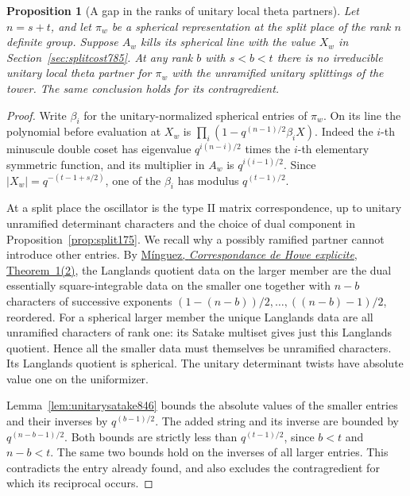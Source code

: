 \documentclass[a4paper,11pt]{article}
\newtheorem{proposition}{Proposition}[section]
\theoremstyle{definition}
\theoremstyle{remark}
\numberwithin{equation}{section}
\begin{document}
\begin{proposition}[A gap in the ranks of unitary local theta partners]
\leavevmode\label{prop:splitpartner846}
Let \(n=s+t\), and let \(\pi_w\) be a spherical representation at
the split place of the rank \(n\) definite group. Suppose \(A_w\)
kills its spherical line with the value \(X_w\) in
Section~\ref{sec:splitcost785}. At any rank \(b\) with \(s<b<t\)
there is no irreducible unitary local theta partner for \(\pi_w\)
with the unramified unitary splittings of the tower. The same
conclusion holds for its contragredient.
\end{proposition}
\begin{proof}
Write \(\beta_i\) for the unitary-normalized spherical entries of
\(\pi_w\). On its line the polynomial before evaluation at \(X_w\)
is \(\prod_i(1-q^{(n-1)/2}\beta_i X)\).
Indeed the \(i\)-th minuscule double coset has eigenvalue
\(q^{i(n-i)/2}\) times the \(i\)-th elementary symmetric
function, and its multiplier in \(A_w\) is \(q^{i(i-1)/2}\).
Since \(|X_w|=q^{-(t-1+s/2)}\), one of the \(\beta_i\)
has modulus \(q^{(t-1)/2}\).

At a split place the oscillator is the type II matrix
correspondence, up to unitary unramified determinant characters
and the choice of dual component in
Proposition~\ref{prop:split175}. We recall why a possibly
ramified partner cannot introduce other entries. By
\href{https://www.numdam.org/item/10.24033/asens.2080.pdf}
{M\'inguez, \emph{Correspondance de Howe explicite},
Theorem~1(2)}, the Langlands quotient data on the larger member
are the dual essentially square-integrable data on the smaller
one together with \(n-b\) characters of successive exponents
\((1-(n-b))/2,\ldots,((n-b)-1)/2\), reordered. For a spherical
larger member the unique Langlands data are all unramified
characters of rank one: its Satake multiset gives just this
Langlands quotient. Hence all the smaller data must themselves
be unramified characters. Its Langlands quotient is spherical.
The unitary determinant twists have absolute value one on the
uniformizer.

Lemma~\ref{lem:unitarysatake846} bounds the absolute values of the
smaller entries and their inverses by \(q^{(b-1)/2}\). The added
string and its inverse are bounded by \(q^{(n-b-1)/2}\). Both
bounds are strictly less than \(q^{(t-1)/2}\), since \(b<t\)
and \(n-b<t\). The same two bounds hold on the inverses of all
larger entries. This contradicts the entry already found, and
also excludes the contragredient for which its reciprocal occurs.
\end{proof}
\end{document}
